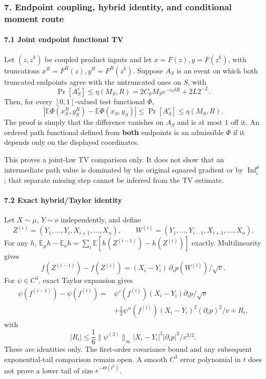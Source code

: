 \subsubsection{7. Endpoint coupling, hybrid identity, and conditional moment route}\label{endpoint-coupling-hybrid-identity-and-conditional-moment-route}

\paragraph{7.1 Joint endpoint functional TV}\label{joint-endpoint-functional-tv}

Let \((z,z^k)\) be coupled product inputs and let \(x=F(z),y=F(z^k)\), with truncations \(x^R=F^R(z),y^R=F^R(z^k)\). Suppose \(A_S\) is an event on which both truncated endpoints agree with the untruncated ones on \(S\), with
\[\Pr[A_S^c]\le\eta(M_S,R)=2C_0M_Se^{-c_0\delta R}+2L2^{-L}.\]
Then, for every \([0,1]\)-valued test functional \(\Phi\),
\[|\mathbb E\Phi(x_S^R,y_S^R)-\mathbb E\Phi(x_S,y_S)|
\le\Pr[A_S^c]\le\eta(M_S,R).\]
The proof is simply that the difference vanishes on \(A_S\) and is at most \(1\) off it. An ordered path functional defined from \textbf{both} endpoints is an admissible \(\Phi\) if it depends only on the displayed coordinates.

This proves a joint-law TV comparison only. It does not show that an intermediate path value is dominated by the original squared gradient or by \(\operatorname{Inf}_i^\mu\); that separate missing step cannot be inferred from the TV estimate.

\paragraph{7.2 Exact hybrid/Taylor identity}\label{exact-hybridtaylor-identity}

Let \(X\sim\mu\), \(Y\sim\nu\) independently, and define
\[Z^{(i)}=(Y_1,\ldots,Y_i,X_{i+1},\ldots,X_n),\qquad
W^{(i)}=(Y_1,\ldots,Y_{i-1},X_{i+1},\ldots,X_n).\]
For any \(h\), \(\mathbb E_\mu h-\mathbb E_\nu h=\sum_i\mathbb E[h(Z^{(i-1)})-h(Z^{(i)})]\) exactly. Multilinearity gives
\[f(Z^{(i-1)})-f(Z^{(i)})
=(X_i-Y_i)\,\partial_ip(W^{(i)})/\sqrt v.\]
For \(\psi\in C^3\), exact Taylor expansion gives
\[\begin{aligned}
\psi(f^{(i-1)})-\psi(f^{(i)})
={}&\psi'(f^{(i)})(X_i-Y_i)\partial_ip/\sqrt v\\
&+\tfrac12\psi''(f^{(i)})(X_i-Y_i)^2(\partial_ip)^2/v+R_i,
\end{aligned}\]
with
\[|R_i|\le\frac16\|\psi^{(3)}\|_\infty
|X_i-Y_i|^3|\partial_ip|^3/v^{3/2}.\]
These are identities only. The first-order covariance bound and any subsequent exponential-tail comparison remain open. A smooth \(C^3\) error polynomial in \(t\) does not prove a lower tail of size \(e^{-\Theta(t^2)}\).

